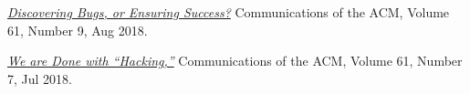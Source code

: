 \documentclass{vl}
\begin{document}
    \begin{samepage}
        \emph{\href{https://www.yegor256.com/pdf/2018/discovering-bugs.pdf}{Discovering Bugs, or Ensuring Success?}}\newline
        Communications of the ACM, Volume 61, Number 9, Aug 2018.
    \end{samepage}

    \begin{samepage}
        \emph{\href{https://www.yegor256.com/pdf/2018/we-are-done-with-hacking.pdf}{We are Done with ``Hacking,''}}\newline
        Communications of the ACM, Volume 61, Number 7, Jul 2018.
    \end{samepage}






\end{document}
